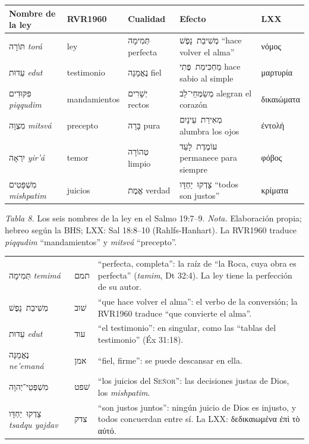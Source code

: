 \documentclass[11pt,letterpaper]{article}
\newcommand{\heb}[1]{\mbox{\foreignlanguage{hebrew}{#1}}}
\newcommand{\grc}[1]{\foreignlanguage{ancientgreek}{#1}}
\newcommand{\SENOR}{\textsc{Señor}}
\begin{document}
\begin{center}\small\renewcommand{\arraystretch}{1.2}
\begin{tabular}{@{}L{2.9cm}L{2.2cm}L{2.7cm}L{4.2cm}L{1.6cm}@{}}
\toprule
\textbf{Nombre de la ley} & \textbf{RVR1960} & \textbf{Cualidad} & \textbf{Efecto} & \textbf{LXX} \\ \midrule
\heb{תּוֹרָה} \emph{torá} & ley & \heb{תְּמִימָה} perfecta & \heb{מְשִׁיבַת נָפֶשׁ} ``hace volver el alma'' & \grc{νόμος} \\
\heb{עֵדוּת} \emph{edut} & testimonio & \heb{נֶאֱמָנָה} fiel & \heb{מַחְכִּימַת פֶּתִי} hace sabio al simple & \grc{μαρτυρία} \\
\heb{פִּקּוּדִים} \emph{piqqudim} & mandamientos & \heb{יְשָׁרִים} rectos & \heb{מְשַׂמְּחֵי־לֵב} alegran el corazón & \grc{δικαιώματα} \\
\heb{מִצְוָה} \emph{mitsvá} & precepto & \heb{בָּרָה} pura & \heb{מְאִירַת עֵינָיִם} alumbra los ojos & \grc{ἐντολή} \\
\heb{יִרְאָה} \emph{yir'á} & temor & \heb{טְהוֹרָה} limpio & \heb{עוֹמֶדֶת לָעַד} permanece para siempre & \grc{φόβος} \\
\heb{מִשְׁפָּטִים} \emph{mishpatim} & juicios & \heb{אֱמֶת} verdad & \heb{צָדְקוּ יַחְדָּו} ``todos son justos'' & \grc{κρίματα} \\
\bottomrule
\end{tabular}\par
{\footnotesize\color{gris}\textit{Tabla 8.} Los seis nombres de la ley en el Salmo 19:7--9. \textit{Nota.} Elaboración propia; hebreo según la BHS; LXX: Sal 18:8--10 (Rahlfs-Hanhart). La RVR1960 traduce \emph{piqqudim} ``mandamientos'' y \emph{mitsvá} ``precepto''.}
\end{center}

\begin{filologia}
\begin{tabular}{@{}L{3.2cm}L{1.6cm}L{10cm}@{}}
\heb{תְּמִימָה} \emph{temimá} & \heb{תמם} & ``perfecta, completa'': la raíz de ``la Roca, cuya obra es perfecta'' (\emph{tamim}, Dt 32:4). La ley tiene la perfección de su autor. \\[2pt]
\heb{מְשִׁיבַת נָפֶשׁ} & \heb{שׁוב} & ``que hace volver el alma'': el verbo de la conversión; la RVR1960 traduce ``que convierte el alma''. \\[2pt]
\heb{עֵדוּת} \emph{edut} & \heb{עוד} & ``el testimonio'': en singular, como las ``tablas del testimonio'' (Éx 31:18). \\[2pt]
\heb{נֶאֱמָנָה} \emph{ne'emaná} & \heb{אמן} & ``fiel, firme'': se puede descansar en ella. \\[2pt]
\heb{מִשְׁפְּטֵי־יְהוָה} & \heb{שׁפט} & ``los juicios del \SENOR'': las decisiones justas de Dios, los \emph{mishpatim}. \\[2pt]
\heb{צָדְקוּ יַחְדָּו} \emph{tsadqu yajdav} & \heb{צדק} & ``son justos juntos'': ningún juicio de Dios es injusto, y todos concuerdan entre sí. La LXX: \grc{δεδικαιωμένα ἐπὶ τὸ αὐτό}. \\
\end{tabular}
\end{filologia}
\end{document}

